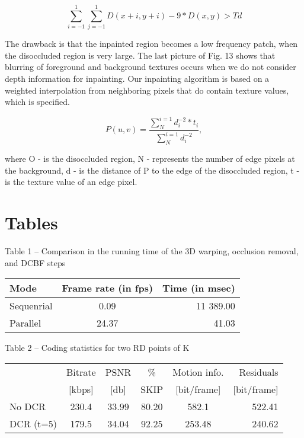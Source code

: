 \documentclass[fleqn,10pt]{a}
\begin{document}
\begin{equation}
\sum \limits _{i=-1}^{1} \sum \limits_{j=-1}^{1}D(x+i,y+i)-9*D(x,y)>Td 
\end{equation}

The drawback is that the inpainted region becomes a low frequency patch, when the disoccluded region is very large. The last picture of Fig. 13 shows that blurring of foreground and background textures occurs when we do not consider depth information for inpainting. Our inpainting algorithm is based on a weighted interpolation from neighboring pixels that do contain texture values, which is specified.

\begin{equation}
P(u,v)=\frac{\sum_{N}^{i=1}d_{i}^{-2}*t_i}{\sum_{N}^{i=1}d_{i}^{-2}},
\end{equation}

where
\newline O - is the disoccluded region,
\newline N - represents the number of edge pixels at the background,
\newline d - is the distance of P to the edge of the disoccluded region, 
\newline t - is the texture value of an edge pixel.
\section{Tables}

Table 1 – Comparison in the running time of the 3D warping, occlusion removal, and DCBF steps

\begin{table}[ht]
\centering
\begin{tabular}{l|cr}
Mode & Frame rate (in fps) & Time (in msec) \\\hline
Sequenrial & 0.09 & 11 389.00 \\
Parallel & 24.37 & 41.03  
\end{tabular}
\end{table}

Table 2 – Coding statistics for two RD points of K

\begin{table}[ht]
\centering
\begin{tabular}{l|ccccr}
 & Bitrate & PSNR & \% & Motion info. & Residuals\\
 & [kbps] & [db] & SKIP & [bit/frame] & [bit/frame] \\\hline
No DCR & 230.4 & 33.99 & 80.20 & 582.1 & 522.41 \\
DCR (t=5) & 179.5 & 34.04 & 92.25 & 253.48 & 240.62  
\end{tabular}
\end{table}
\clearpage
\end{document}

